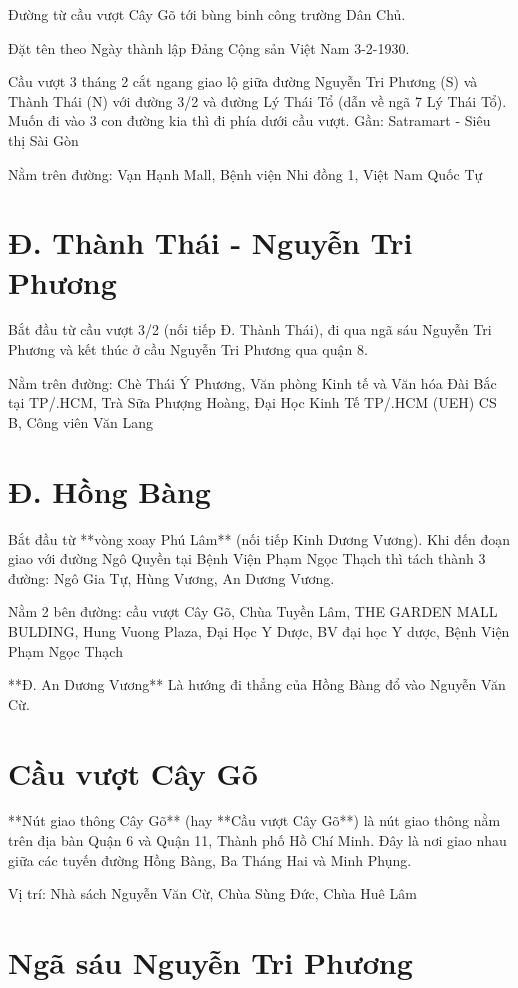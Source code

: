 Đường từ cầu vượt Cây Gõ tới bùng binh công trường Dân Chủ.

Đặt tên theo Ngày thành lập Đảng Cộng sản Việt Nam 3-2-1930.

Cầu vượt 3 tháng 2 cắt ngang giao lộ giữa đường Nguyễn Tri Phương (S) và Thành Thái (N) với đường 3/2 và đường Lý Thái Tổ (dẫn về ngã 7 Lý Thái Tổ). Muốn đi vào 3 con đường kia thì đi phía dưới cầu vượt. Gần: Satramart - Siêu thị Sài Gòn

Nằm trên đường: Vạn Hạnh Mall, Bệnh viện Nhi đồng 1, Việt Nam Quốc Tự

\section{Đ. Thành Thái - Nguyễn Tri Phương}

Bắt đầu từ cầu vượt 3/2 (nối tiếp Đ. Thành Thái), đi qua ngã sáu Nguyễn Tri Phương và kết thúc ở cầu Nguyễn Tri Phương qua quận 8.

Nằm trên đường: Chè Thái Ý Phương, Văn phòng Kinh tế và Văn hóa Đài Bắc tại TP/.HCM, Trà Sữa Phượng Hoàng, Đại Học Kinh Tế TP/.HCM (UEH) CS B, Công viên Văn Lang

\section{Đ. Hồng Bàng}

Bắt đầu từ **vòng xoay Phú Lâm** (nối tiếp Kinh Dương Vương). Khi đến đoạn giao với đường Ngô Quyền tại Bệnh Viện Phạm Ngọc Thạch thì tách thành 3 đường: Ngô Gia Tự, Hùng Vương, An Dương Vương.

Nằm 2 bên đường: cầu vượt Cây Gõ, Chùa Tuyền Lâm, THE GARDEN MALL BULDING, Hung Vuong Plaza, Đại Học Y Dược, BV đại học Y dược, Bệnh Viện Phạm Ngọc Thạch

**Đ. An Dương Vương** Là hướng đi thẳng của Hồng Bàng đổ vào Nguyễn Văn Cừ.

\section{Cầu vượt Cây Gõ}

**Nút giao thông Cây Gõ** (hay **Cầu vượt Cây Gõ**) là nút giao thông nằm trên địa bàn Quận 6 và Quận 11, Thành phố Hồ Chí Minh. Đây là nơi giao nhau giữa các tuyến đường Hồng Bàng, Ba Tháng Hai và Minh Phụng.

Vị trí: Nhà sách Nguyễn Văn Cừ, Chùa Sùng Đức, Chùa Huê Lâm

\section{Ngã sáu Nguyễn Tri Phương}


